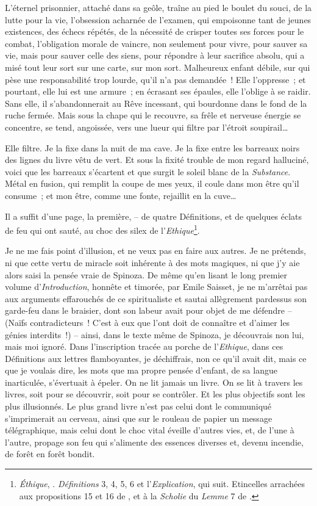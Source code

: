 L'éternel prisonnier, attaché dans sa geôle, traîne au pied le boulet du
souci, de la lutte pour la vie, l'obsession acharnée de l'examen, qui
empoisonne tant de jeunes existences, des échecs répétés, de la
nécessité de crisper toutes ses forces pour le combat, l'obligation
morale de vaincre, non seulement pour vivre, pour sauver sa vie, mais
pour sauver celle des siens, pour répondre à leur sacrifice absolu, qui
a misé tout leur sort sur une carte, sur mon sort. Malheureux enfant
débile, sur qui pèse une responsabilité trop lourde, qu'il n'a pas
demandée~! Elle l'oppresse~; et pourtant, elle lui est une armure~; en
écrasant ses épaules, elle l'oblige à se raidir. Sans elle, il
s'abandonnerait au Rêve incessant, qui bourdonne dans le fond de la
ruche fermée. Mais sous la chape qui le recouvre, sa frêle et nerveuse
énergie se concentre, se tend, angoissée, vers une lueur qui filtre par
l'étroit soupirail\ldots{}

Elle filtre. Je la fixe dans la nuit de ma cave. Je la fixe entre les
barreaux noirs des lignes du livre vêtu de vert. Et sous la fixité
trouble de mon regard halluciné, voici que les barreaux s'écartent et
que surgit le soleil blanc de la \emph{Substance}. Métal en fusion, qui
remplit la coupe de mes yeux, il coule dans mon être qu'il consume~; et
mon être, comme une fonte, rejaillit en la cuve\ldots{}

Il a suffit d'une page, la première, -- de quatre Définitions, et de
quelques éclats de feu qui ont sauté, au choc des silex de
l'\emph{Ethique}\footnote{\emph{Éthique}, . \emph{Définitions} 3, 4, 5,
  6 et l'\emph{Explication}, qui suit. Etincelles arrachées aux
  propositions 15 et 16 de , et à la \emph{Scholie} du \emph{Lemme} 7
  de .}.

Je ne me fais point d'illusion, et ne veux pas en faire aux autres. Je
ne prétends, ni que cette vertu de miracle soit inhérente à des mots
magiques, ni que j'y aie alors saisi la pensée vraie de Spinoza. De même
qu'en lisant le long premier volume d'\emph{Introduction}, honnête et
timorée, par Emile Saisset, je ne m'arrêtai pas aux arguments
effarouchés de ce spiritualiste et sautai allègrement pardessus son
garde-feu dans le braisier, dont son labeur avait pour objet de me
défendre -- (Naïfs contradicteurs~! C'est à eux que l'ont doit de
connaître et d'aimer les génies interdits~!) -- ainsi, dans le texte
même de Spinoza, je découvrais non lui, mais moi ignoré. Dans
l'inscription tracée au porche de l'\emph{Ethique}, dans ces Définitions
aux lettres flamboyantes, je déchiffrais, non ce qu'il avait dit, mais
ce que je voulais dire, les mots que ma propre pensée d'enfant, de sa
langue inarticulée, s'évertuait à épeler. On ne lit jamais un livre. On
se lit à travers les livres, soit pour se découvrir, soit pour se
contrôler. Et les plus objectifs sont les plus illusionnés. Le plus
grand livre n'est pas celui dont le communiqué s'imprimerait au cerveau,
ainsi que sur le rouleau de papier un message télégraphique, mais celui
dont le choc vital éveille d'autres vies, et, de l'une à l'autre,
propage son feu qui s'alimente des essences diverses et, devenu
incendie, de forêt en forêt bondit.

